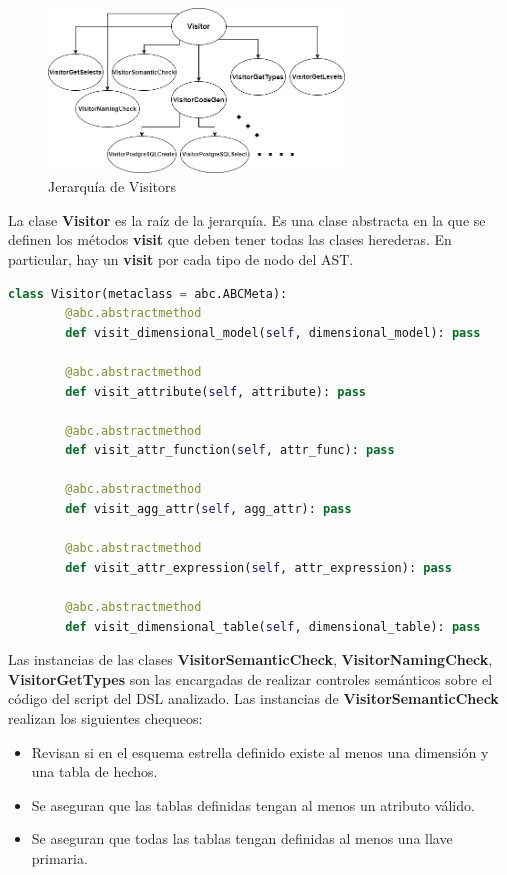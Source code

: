 \begin{figure}[htb]
    \centering
    \includegraphics[width=0.7\textwidth]{Graphics/visitorfixed.drawio.png}
    \caption{Jerarquía de Visitors}
    \label{fig:visitors}
\end{figure}

La clase \textbf{Visitor} es la raíz de la jerarquía. Es una clase abstracta en la que se definen los métodos 
\textbf{visit} que deben tener todas las clases herederas. En particular, hay un \textbf{visit} por cada tipo de 
nodo del AST. 

\begin{lstlisting}[label={code:visitors}, caption={Clase Visitor}, language={python}]
    class Visitor(metaclass = abc.ABCMeta):
        @abc.abstractmethod
        def visit_dimensional_model(self, dimensional_model): pass 

        @abc.abstractmethod
        def visit_attribute(self, attribute): pass

        @abc.abstractmethod
        def visit_attr_function(self, attr_func): pass

        @abc.abstractmethod
        def visit_agg_attr(self, agg_attr): pass

        @abc.abstractmethod
        def visit_attr_expression(self, attr_expression): pass

        @abc.abstractmethod
        def visit_dimensional_table(self, dimensional_table): pass
\end{lstlisting}

Las instancias de las clases \textbf{VisitorSemanticCheck}, \textbf{VisitorNamingCheck}, \textbf{VisitorGetTypes} 
son las encargadas de realizar
controles semánticos sobre el código del script del DSL analizado. Las instancias de \textbf{VisitorSemanticCheck} realizan los siguientes 
chequeos:

\begin{itemize}
    \item Revisan si en el esquema estrella definido existe al menos una dimensión y una tabla de hechos.
    \item Se aseguran que las tablas definidas tengan al menos un atributo válido.
    \item Se aseguran que todas las tablas tengan definidas al menos una llave primaria.
\end{itemize}


